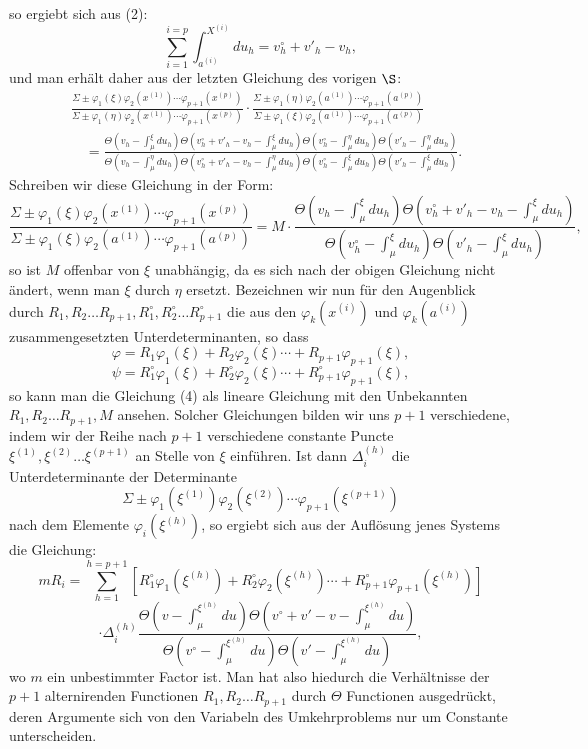 \documentclass[10pt]{article}
\begin{document}
so ergiebt sich aus (2):
\[
\sum_{i=1}^{i=p}\int_{a^{(i)}}^{X^{(i)}}du_h=v_h^\circ+v'_h-v_h,
\]
und man erhält daher aus der letzten Gleichung des vorigen \(\S\):
\[
\tag{3}
\begin{aligned}
&\frac{\Sigma\pm\varphi_1(\xi)\varphi_2(x^{(1)})\cdots\varphi_{p+1}(x^{(p)})}
{\Sigma\pm\varphi_1(\eta)\varphi_2(x^{(1)})\cdots\varphi_{p+1}(x^{(p)})}
\cdot
\frac{\Sigma\pm\varphi_1(\eta)\varphi_2(a^{(1)})\cdots\varphi_{p+1}(a^{(p)})}
{\Sigma\pm\varphi_1(\xi)\varphi_2(a^{(1)})\cdots\varphi_{p+1}(a^{(p)})}\\
&\quad=
\frac{
\Theta\!\left(v_h-\int_{\mu}^{\xi}du_h\right)
\Theta\!\left(v_h^\circ+v'_h-v_h-\int_{\mu}^{\xi}du_h\right)
\Theta\!\left(v_h^\circ-\int_{\mu}^{\eta}du_h\right)
\Theta\!\left(v'_h-\int_{\mu}^{\eta}du_h\right)}
{\Theta\!\left(v_h-\int_{\mu}^{\eta}du_h\right)
\Theta\!\left(v_h^\circ+v'_h-v_h-\int_{\mu}^{\eta}du_h\right)
\Theta\!\left(v_h^\circ-\int_{\mu}^{\xi}du_h\right)
\Theta\!\left(v'_h-\int_{\mu}^{\xi}du_h\right)}.
\end{aligned}
\]
Schreiben wir diese Gleichung in der Form:
\[
\tag{4}
\frac{\Sigma\pm\varphi_1(\xi)\varphi_2(x^{(1)})\cdots\varphi_{p+1}(x^{(p)})}
{\Sigma\pm\varphi_1(\xi)\varphi_2(a^{(1)})\cdots\varphi_{p+1}(a^{(p)})}
=
M\cdot
\frac{
\Theta\!\left(v_h-\int_{\mu}^{\xi}du_h\right)
\Theta\!\left(v_h^\circ+v'_h-v_h-\int_{\mu}^{\xi}du_h\right)}
{\Theta\!\left(v_h^\circ-\int_{\mu}^{\xi}du_h\right)
\Theta\!\left(v'_h-\int_{\mu}^{\xi}du_h\right)},
\]
so ist \(M\) offenbar von \(\xi\) unabhängig, da es sich nach der obigen Gleichung nicht ändert, wenn man \(\xi\) durch \(\eta\) ersetzt. Bezeichnen wir nun für den Augenblick durch \(R_1,R_2\ldots R_{p+1},R_1^\circ,R_2^\circ\ldots R_{p+1}^\circ\) die aus den \(\varphi_k(x^{(i)})\) und \(\varphi_k(a^{(i)})\) zusammengesetzten Unterdeterminanten, so dass
\[
\varphi=R_1\varphi_1(\xi)+R_2\varphi_2(\xi)\cdots+R_{p+1}\varphi_{p+1}(\xi),
\]
\[
\psi=R_1^\circ\varphi_1(\xi)+R_2^\circ\varphi_2(\xi)\cdots+R_{p+1}^\circ\varphi_{p+1}(\xi),
\]
so kann man die Gleichung (4) als lineare Gleichung mit den Unbekannten \(R_1,R_2\ldots R_{p+1},M\) ansehen. Solcher Gleichungen bilden wir uns \(p+1\) verschiedene, indem wir der Reihe nach \(p+1\) verschiedene constante Puncte \(\xi^{(1)},\xi^{(2)}\ldots\xi^{(p+1)}\) an Stelle von \(\xi\) einführen. Ist dann \(\Delta_i^{(h)}\) die Unterdeterminante der Determinante
\[
\Sigma\pm\varphi_1(\xi^{(1)})\varphi_2(\xi^{(2)})\cdots\varphi_{p+1}(\xi^{(p+1)})
\]
nach dem Elemente \(\varphi_i(\xi^{(h)})\), so ergiebt sich aus der Auflösung jenes Systems die Gleichung:
\[
mR_i=
\sum_{h=1}^{h=p+1}
\left[R_1^\circ\varphi_1(\xi^{(h)})+R_2^\circ\varphi_2(\xi^{(h)})\cdots+
R_{p+1}^\circ\varphi_{p+1}(\xi^{(h)})\right]
\]
\[
\cdot\Delta_i^{(h)}
\frac{
\Theta\!\left(v-\int_{\mu}^{\xi^{(h)}}du\right)
\Theta\!\left(v^\circ+v'-v-\int_{\mu}^{\xi^{(h)}}du\right)}
{\Theta\!\left(v^\circ-\int_{\mu}^{\xi^{(h)}}du\right)
\Theta\!\left(v'-\int_{\mu}^{\xi^{(h)}}du\right)},
\]
wo \(m\) ein unbestimmter Factor ist. Man hat also hiedurch die Verhältnisse der \(p+1\) alternirenden Functionen \(R_1,R_2\ldots R_{p+1}\) durch \(\Theta\) Functionen ausgedrückt, deren Argumente sich von den Variabeln des Umkehrproblems nur um Constante unterscheiden.
\clearpage
\end{document}
